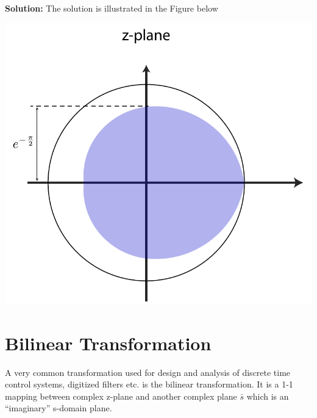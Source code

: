 \documentclass[twoside]{article}
\begin{document}
\textbf{Solution:} The solution is illustrated in the Figure below
%
    \begin{center}
\begin{minipage}[h]{0.5\linewidth}
    \begin{center}
      \includegraphics[width=\textwidth]{dampingexamplesol}
    \end{center}
\end{minipage}
    \end{center}

\section*{Bilinear Transformation}

A very common transformation used for design and analysis 
of discrete time control systems, digitized filters etc. is 
the bilinear transformation. It is a 1-1 mapping between 
complex z-plane and another complex plane $\bar{s}$ which 
is an ``imaginary'' s-domain plane. 
\end{document}
